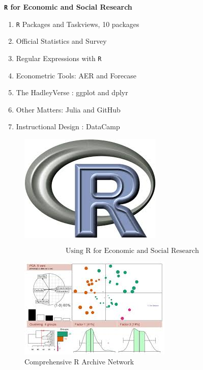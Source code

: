 \documentclass{beamer}
\begin{document}
\begin{frame}
\textbf{\texttt{R} for Economic and Social Research}
\begin{enumerate}
\item \texttt{R} Packages and Taskviews, 10 packages
\item Official Statistics and Survey 
\item Regular Expressions with \texttt{R}
\item Econometric Tools: AER and Forecase
\item The HadleyVerse : ggplot and dplyr
\item Other Matters:  Julia and GitHub
\item Instructional Design : DataCamp
\end{enumerate}

\end{frame}
\begin{frame}
\begin{figure}
\centering
\includegraphics[width=0.7\linewidth]{Rlogo}
\end{figure}
\LARGE
\[ \mbox{Using R for Economic and Social Research} \]	



\end{frame}



\begin{frame}[fragile]
	
	
	\begin{figure}
\centering
\includegraphics[width=0.7\linewidth]{CRAN}
\caption{Comprehensive R Archive Network}

\end{figure}
	
	
\end{frame}
\end{document}
